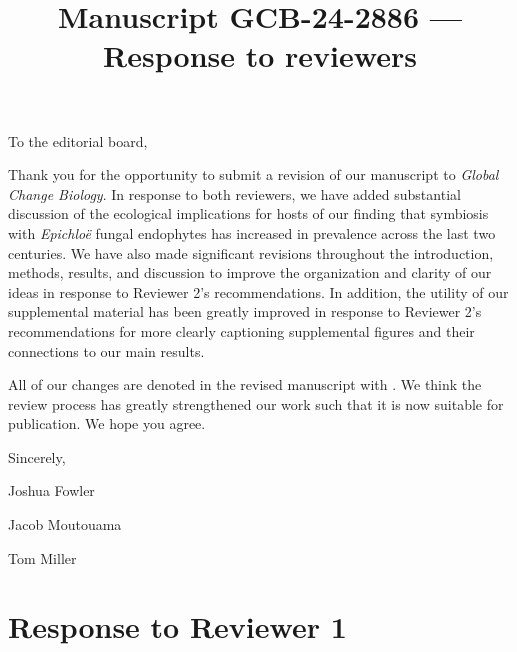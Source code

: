 \documentclass[12pt]{article}
\newcommand{\revise}[1]{{\color{Mahogany}{#1}}}
\begin{document}
\title{Manuscript GCB-24-2886 --- Response to reviewers}

\maketitle
\noindent To the editorial board,


Thank you for the opportunity to submit a revision of our manuscript to \emph{Global Change Biology}. 
In response to both reviewers, we have added substantial discussion of the ecological implications for hosts of our finding that symbiosis with \emph{Epichloë} fungal endophytes has increased in prevalence across the last two centuries.
We have also made significant revisions throughout the introduction, methods, results, and discussion to improve the organization and clarity of our ideas in response to Reviewer 2's recommendations.   
In addition, the utility of our supplemental material has been greatly improved in response to Reviewer 2's recommendations for more clearly captioning supplemental figures and their connections to our main results. 

All of our changes are denoted in the revised manuscript with \revise{Mahogany font}. 
We think the review process has greatly strengthened our work such that it is now suitable for publication.
We hope you agree. 

\vspace{2em}
Sincerely,

Joshua Fowler

Jacob Moutouama

Tom Miller

\newpage

\section{Response to Reviewer 1}
\vspace{-2em}
\end{document}
